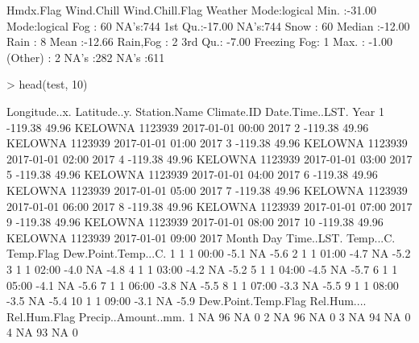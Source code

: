 \documentclass[11pt, a4paper]{article}
\begin{document}
\begin{Schunk}
\begin{Soutput}
 Hmdx.Flag        Wind.Chill     Wind.Chill.Flag         Weather   
 Mode:logical   Min.   :-31.00   Mode:logical    Fog         : 60  
 NA's:744       1st Qu.:-17.00   NA's:744        Snow        : 60  
                Median :-12.00                   Rain        :  8  
                Mean   :-12.66                   Rain,Fog    :  2  
                3rd Qu.: -7.00                   Freezing Fog:  1  
                Max.   : -1.00                   (Other)     :  2  
                NA's   :282                      NA's        :611  
\end{Soutput}
\begin{Sinput}
> head(test, 10)
\end{Sinput}
\begin{Soutput}
   Longitude..x. Latitude..y. Station.Name Climate.ID  Date.Time..LST. Year
1        -119.38        49.96      KELOWNA    1123939 2017-01-01 00:00 2017
2        -119.38        49.96      KELOWNA    1123939 2017-01-01 01:00 2017
3        -119.38        49.96      KELOWNA    1123939 2017-01-01 02:00 2017
4        -119.38        49.96      KELOWNA    1123939 2017-01-01 03:00 2017
5        -119.38        49.96      KELOWNA    1123939 2017-01-01 04:00 2017
6        -119.38        49.96      KELOWNA    1123939 2017-01-01 05:00 2017
7        -119.38        49.96      KELOWNA    1123939 2017-01-01 06:00 2017
8        -119.38        49.96      KELOWNA    1123939 2017-01-01 07:00 2017
9        -119.38        49.96      KELOWNA    1123939 2017-01-01 08:00 2017
10       -119.38        49.96      KELOWNA    1123939 2017-01-01 09:00 2017
   Month Day Time..LST. Temp...C. Temp.Flag Dew.Point.Temp...C.
1      1   1      00:00      -5.1        NA                -5.6
2      1   1      01:00      -4.7        NA                -5.2
3      1   1      02:00      -4.0        NA                -4.8
4      1   1      03:00      -4.2        NA                -5.2
5      1   1      04:00      -4.5        NA                -5.7
6      1   1      05:00      -4.1        NA                -5.6
7      1   1      06:00      -3.8        NA                -5.5
8      1   1      07:00      -3.3        NA                -5.5
9      1   1      08:00      -3.5        NA                -5.4
10     1   1      09:00      -3.1        NA                -5.9
   Dew.Point.Temp.Flag Rel.Hum.... Rel.Hum.Flag Precip..Amount..mm.
1                   NA          96           NA                   0
2                   NA          96           NA                   0
3                   NA          94           NA                   0
4                   NA          93           NA                   0

\end{Soutput}
\end{Schunk}
\end{document}
